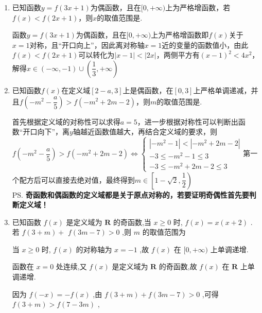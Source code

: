\begin{enumerate}
\begin{enumerate}
\begin{jieda}
        所以 $\left| {a - 1 + 1}\right|  \leq  1 + 1$ ,解得 $- 2 \leq  a \leq  2$ .
    \end{jieda}
    \item 已知函数$y = f(3x+1)$为偶函数，且在$[0, +\infty)$上为严格增函数，若$f(x) < f(2x+1)$，则$x$的取值范围是.
    \begin{jieda}
        函数$y = f(3x+1)$为偶函数，且在$[0, +\infty)$上为严格增函数即$f(x)$关于$x = 1$对称，且“开口向上”，因此离对称轴$x = 1$近的变量的函数值小，由此$f(x) < f(2x+1)$可以转化为$|x-1| < |2x|$，两侧平方有$(x-1)^2 < 4x^2$，解得$x \in (-\infty, -1) \cup (\dfrac{1}{3}, +\infty)$
    \end{jieda}
    \item 已知函数$f(x)$在定义域$[2-a, 3]$上是偶函数，在$[0, 3]$上严格单调递减，并且$f\left(-m^2-\dfrac{a}{5}\right) > f(-m^2+2m-2)$，则$m$的取值范围是\blkda[3]{$\left[1-\sqrt{2}, \dfrac{1}{2}\right)$}.
    \begin{jieda}
        首先根据定义域的对称性可以求得$a = 5$，进一步根据对称性可以判断出函数“开口向下”，离$y$轴越近函数值越大，再结合定义域的要求，则$f\left(-m^2-\dfrac{a}{5}\right)  > f(-m^2+2m-2) \Longleftrightarrow \left \{ \begin{array}{l}
             |-m^2-1| < |-m^2+2m-2|  \\
             -3 \leq -m^2-1 \leq 3  \\
             -3 \leq -m^2+2m-2 \leq 3 
        \end{array}\right.$第一个配方后可以直接去绝对值，最终得到$m \in \left[1-\sqrt{2}, \dfrac{1}{2}\right)$ \\
        \ps \textbf{奇函数和偶函数的定义域都是关于原点对称的，若要证明奇偶性首先要判断定义域！}
    \end{jieda}
    \item 已知函数 $f\left( x\right)$ 是定义域为 $\mathbf{R}$ 的奇函数,当 $x \geq  0$ 时, $f\left( x\right)  = x\left( {x + 2}\right)$ . 若 $f\left( {3 + m}\right)  +$  $f\left( {{3m} - 7}\right)  > 0$ ,则 $m$ 的取值范围为
    \begin{jieda}
        当 $x \geq  0$ 时, $f\left( x\right)$ 的对称轴为 $x =  - 1$ ,故 $f\left( x\right)$ 在 $\lbrack 0, + \infty )$ 上单调递增.

        函数在 $x = 0$ 处连续,又 $f\left( x\right)$ 是定义域为 $\mathbf{R}$ 的奇函数,故 $f\left( x\right)$ 在 $\mathbf{R}$ 上单调递增.
        
        因为 $f\left( {-x}\right)  =  - f\left( x\right)$ ,由 $f\left( {3 + m}\right)  + f\left( {{3m} - 7}\right)  > 0$ ,可得 $f\left( {3 + m}\right)  > f\left( {7 - {3m}}\right)$ ,
        

\end{jieda}
\end{enumerate}
\end{enumerate}
